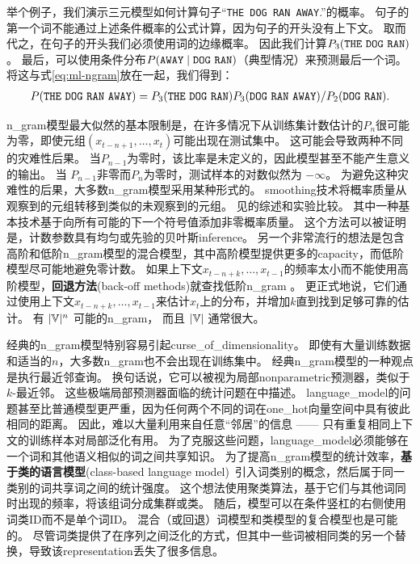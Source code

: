 举个例子，我们演示三元模型如何计算句子``{\tt THE DOG RAN AWAY}.''的概率。
句子的第一个词不能通过上述条件概率的公式计算，因为句子的开头没有上下文。
取而代之，在句子的开头我们必须使用词的边缘概率。
因此我们计算$P_3({\tt THE\ DOG\ RAN})$。
最后，可以使用条件分布$P({\tt AWAY} \mid {\tt DOG\ RAN})$（典型情况）来预测最后一个词。
将这与式\eqref{eq:ml-ngram}放在一起，我们得到：
\begin{align}
P({\tt THE\ DOG\ RAN\ AWAY}) = P_3({\tt THE\ DOG\ RAN}) P_3({\tt DOG\ RAN\ AWAY}) / P_2({\tt DOG\ RAN}).
\end{align}

\gls{n_gram}模型最大似然的基本限制是，在许多情况下从训练集计数估计的$P_n$很可能为零，即使元组$(x_{t-n+1},  \ldots, x_{t})$可能出现在测试集中。
这可能会导致两种不同的灾难性后果。
当$P_{n-1}$为零时，该比率是未定义的，因此模型甚至不能产生意义的输出。
当 $P_{n-1}$非零而$P_n$为零时，测试样本的对数似然为 $-\infty$。
为避免这种灾难性的后果，大多数\gls{n_gram}模型采用某种形式的。
\gls{smoothing}技术将概率质量从观察到的元组转移到类似的未观察到的元组。
见\citet{Chen+Goodman99}的综述和实验比较。
其中一种基本技术基于向所有可能的下一个符号值添加非零概率质量。
这个方法可以被证明是，计数参数具有均匀或先验的贝叶斯\gls{inference}。
另一个非常流行的想法是包含高阶和低阶\gls{n_gram}模型的混合模型，其中高阶模型提供更多的\gls{capacity}，而低阶模型尽可能地避免零计数。
如果上下文$x_{t-n+k}, \ldots, x_{t-1}$的频率太小而不能使用高阶模型，\textbf{回退方法}(back-off methods)就查找低阶\gls{n_gram} 。
更正式地说，它们通过使用上下文$x_{t-n+k}, \ldots, x_{t-1}$来估计$x_t$上的分布，并增加$k$直到找到足够可靠的估计。
有 $|\mathbb{V}|^n$ 可能的\gls{n_gram}， 而且 $|\mathbb{V}|$ 通常很大。

经典的\gls{n_gram}模型特别容易引起\gls{curse_of_dimensionality}。
即使有大量训练数据和适当的$n$，大多数\gls{n_gram}也不会出现在训练集中。
经典\gls{n_gram}模型的一种观点是执行最近邻查询。
换句话说，它可以被视为局部\gls{nonparametric}预测器，类似于$k$-最近邻。
这些极端局部预测器面临的统计问题在中描述。
\gls{language_model}的问题甚至比普通模型更严重，因为任何两个不同的词在\gls{one_hot}向量空间中具有彼此相同的距离。
因此，难以大量利用来自任意``邻居''的信息 —— 只有重复相同上下文的训练样本对局部泛化有用。
为了克服这些问题，\gls{language_model}必须能够在一个词和其他语义相似的词之间共享知识。
为了提高\gls{n_gram}模型的统计效率，\textbf{基于类的语言模型}(class-based language model)~\citep{Brown92,Ney+Kneser93,Niesler98}引入词类别的概念，然后属于同一类别的词共享词之间的统计强度。
这个想法使用聚类算法，基于它们与其他词同时出现的频率，将该组词分成集群或类。
随后，模型可以在条件竖杠的右侧使用词类ID而不是单个词ID。
混合（或回退）词模型和类模型的复合模型也是可能的。
尽管词类提供了在序列之间泛化的方式，但其中一些词被相同类的另一个替换，导致该\gls{representation}丢失了很多信息。

